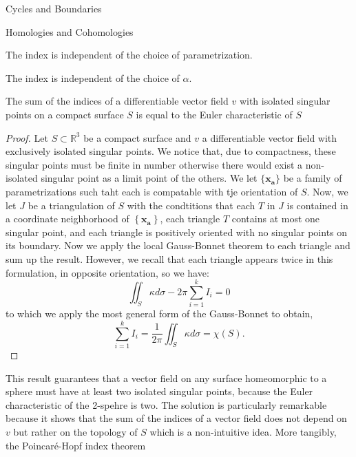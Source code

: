 \begin{subsubsection}{Cycles and Boundaries}
\begin{subsubsection}{Homologies and Cohomologies}
 \begin{proposition} The index is independent of the choice of parametrization.
 \end{proposition}
 \begin{proposition} The index is independent of the choice of $\alpha$.
 \end{proposition}
 \begin{theorem}
  The sum of the indices of a differentiable vector field $v$ with isolated
  singular points on a compact surface $S$ is equal to the Euler characteristic
  of $S$
 \end{theorem}
\begin{proof}
  Let $S\subset \mathbb{R}^3$ be a compact surface and $v$ a differentiable
  vector field with exclusively isolated singular points. We notice that, due
to compactness, these singular points must be finite in number otherwise
there would exist a non-isolated singular point as a limit point of the
others. We let $\{\textbf{x}_\textbf{a}\}$ be a family of parametrizations
such taht each is compatable with tje orientation of $S$. Now, we let $J$
be a triangulation of $S$ with the condtitions that each $T$ in $J$ is
contained in a coordinate neighborhood of $\left\{\textbf{x}_\textbf{a}\right\}$, each
triangle $T$ contains at most one singular point, and each triangle
is positively oriented with no singular points on its boundary. Now
we apply the local Gauss-Bonnet theorem to each triangle and sum up the
result. However, we recall that each triangle appears twice in this
formulation, in opposite orientation, so we have:
 \begin{equation}
   \iint_S\kappa d\sigma - 2\pi\sum_{i=1}^k I_i = 0
 \end{equation}
to which we apply the most general form of the Gauss-Bonnet to obtain,
 \begin{equation}
   \sum_{i=1}^k I_i = \frac{1}{2\pi}\iint_S\kappa d\sigma = \chi(S).
 \end{equation}
\end{proof}
\begin{remark}
  This result guarantees that a vector field on any surface homeomorphic to a
  sphere must have at least two isolated singular points, because the Euler
  characteristic of the 2-spehre is two. The solution is particularly
  remarkable because it shows that the sum of the indices of a vector field
  does not depend on $v$ but rather on the topology of $S$ which is
  a non-intuitive idea. More tangibly, the Poincar\'e-Hopf index theorem 

\end{remark}
\end{subsubsection}
\end{subsubsection}
